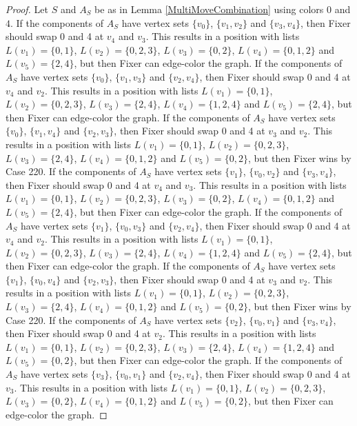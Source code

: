 \documentclass[12pt]{amsart}
\theoremstyle{plain}
\theoremstyle{definition}
\theoremstyle{remark}
\begin{document}
\begin{proof}
Let $S$ and $A_S$ be as in Lemma \ref{MultiMoveCombination} using colors $0$ and $4$. If the components of $A_S$ have vertex sets $\{v_0\}$, $\{v_1, v_2\}$ and $\{v_3, v_4\}$, then Fixer should swap 0 and 4 at $v_4$ and $v_3$. This results in a position with lists $L(v_1) = \{0, 1\}$, $L(v_2) = \{0, 2, 3\}$, $L(v_3) = \{0, 2\}$, $L(v_4) = \{0, 1, 2\}$ and $L(v_5) = \{2, 4\}$, but then Fixer can edge-color the graph.
If the components of $A_S$ have vertex sets $\{v_0\}$, $\{v_1, v_3\}$ and $\{v_2, v_4\}$, then Fixer should swap 0 and 4 at $v_4$ and $v_2$. This results in a position with lists $L(v_1) = \{0, 1\}$, $L(v_2) = \{0, 2, 3\}$, $L(v_3) = \{2, 4\}$, $L(v_4) = \{1, 2, 4\}$ and $L(v_5) = \{2, 4\}$, but then Fixer can edge-color the graph.
If the components of $A_S$ have vertex sets $\{v_0\}$, $\{v_1, v_4\}$ and $\{v_2, v_3\}$, then Fixer should swap 0 and 4 at $v_3$ and $v_2$. This results in a position with lists $L(v_1) = \{0, 1\}$, $L(v_2) = \{0, 2, 3\}$, $L(v_3) = \{2, 4\}$, $L(v_4) = \{0, 1, 2\}$ and $L(v_5) = \{0, 2\}$, but then Fixer wins by Case 220.
If the components of $A_S$ have vertex sets $\{v_1\}$, $\{v_0, v_2\}$ and $\{v_3, v_4\}$, then Fixer should swap 0 and 4 at $v_4$ and $v_3$. This results in a position with lists $L(v_1) = \{0, 1\}$, $L(v_2) = \{0, 2, 3\}$, $L(v_3) = \{0, 2\}$, $L(v_4) = \{0, 1, 2\}$ and $L(v_5) = \{2, 4\}$, but then Fixer can edge-color the graph.
If the components of $A_S$ have vertex sets $\{v_1\}$, $\{v_0, v_3\}$ and $\{v_2, v_4\}$, then Fixer should swap 0 and 4 at $v_4$ and $v_2$. This results in a position with lists $L(v_1) = \{0, 1\}$, $L(v_2) = \{0, 2, 3\}$, $L(v_3) = \{2, 4\}$, $L(v_4) = \{1, 2, 4\}$ and $L(v_5) = \{2, 4\}$, but then Fixer can edge-color the graph.
If the components of $A_S$ have vertex sets $\{v_1\}$, $\{v_0, v_4\}$ and $\{v_2, v_3\}$, then Fixer should swap 0 and 4 at $v_3$ and $v_2$. This results in a position with lists $L(v_1) = \{0, 1\}$, $L(v_2) = \{0, 2, 3\}$, $L(v_3) = \{2, 4\}$, $L(v_4) = \{0, 1, 2\}$ and $L(v_5) = \{0, 2\}$, but then Fixer wins by Case 220.
If the components of $A_S$ have vertex sets $\{v_2\}$, $\{v_0, v_1\}$ and $\{v_3, v_4\}$, then Fixer should swap 0 and 4 at $v_2$. This results in a position with lists $L(v_1) = \{0, 1\}$, $L(v_2) = \{0, 2, 3\}$, $L(v_3) = \{2, 4\}$, $L(v_4) = \{1, 2, 4\}$ and $L(v_5) = \{0, 2\}$, but then Fixer can edge-color the graph.
If the components of $A_S$ have vertex sets $\{v_3\}$, $\{v_0, v_1\}$ and $\{v_2, v_4\}$, then Fixer should swap 0 and 4 at $v_3$. This results in a position with lists $L(v_1) = \{0, 1\}$, $L(v_2) = \{0, 2, 3\}$, $L(v_3) = \{0, 2\}$, $L(v_4) = \{0, 1, 2\}$ and $L(v_5) = \{0, 2\}$, but then Fixer can edge-color the graph.

\end{proof}
\end{document}
